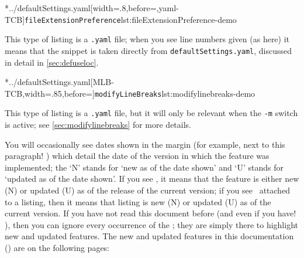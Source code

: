 	\begin{minipage}{.4\textwidth}
		\cmhlistingsfromfile[style=fileExtensionPreference]*{../defaultSettings.yaml}[width=.8\linewidth,before=\centering,yaml-TCB]{\texttt{fileExtensionPreference}}{lst:fileExtensionPreference-demo}
	\end{minipage}%
	\hfill
	\begin{minipage}{.4\textwidth}
		This type of listing is a \texttt{.yaml} file; when you see line numbers given (as here) it means that the snippet is taken directly from \texttt{defaultSettings.yaml}, discussed in detail in \vref{sec:defuseloc}.
	\end{minipage}%

	\begin{minipage}{.55\textwidth}
		\cmhlistingsfromfile[style=modifylinebreaks]*{../defaultSettings.yaml}[MLB-TCB,width=.85\linewidth,before=\centering]{\texttt{modifyLineBreaks}}{lst:modifylinebreaks-demo}
	\end{minipage}%
	\hfill
	\begin{minipage}{.4\textwidth}
		This type of listing is a \texttt{.yaml} file, but it will only be relevant when the \texttt{-m} switch is active; see \vref{sec:modifylinebreaks} for more details.
	\end{minipage}%

	You will occasionally see dates shown in the margin (for example, next to this paragraph!
	)
	 which detail the date of the version in which the feature was implemented;
	the `N' stands for `new as of the date shown' and `U' stands for `updated as of the date shown'.
	If you see \stardemo, it means that the feature is either new (N) or updated (U) as of the release of the current version; if you see \stardemo\, attached to a listing, then it means that listing is new (N) or updated (U) as of the current version.
	If you have not read this document before (and even if you have!
	), then you can ignore every occurrence of the \stardemo;
	they are simply there to highlight new and updated features.
	The new and updated features in this documentation (\gitRel) are on the following pages: \listOfNewFeatures  

